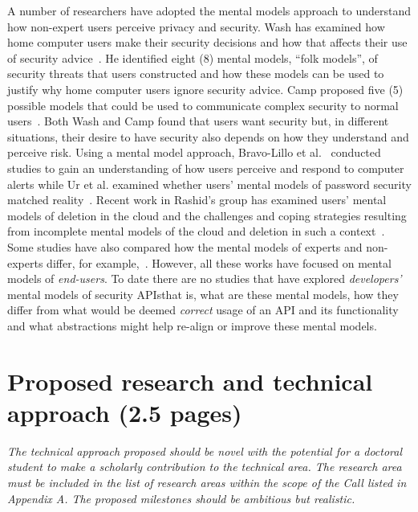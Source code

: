 \documentclass[10pt]{article}
\begin{document}
A number of researchers have adopted the mental models approach to understand how non-expert users perceive privacy and security. Wash has examined how home computer users make their security decisions and how that affects their use of security advice~\cite{wash2010folk}. He identified eight (8) mental models, ``folk models'', of security threats that users constructed and how these models can be used to justify why home computer users ignore security advice. Camp proposed five (5) possible models that could be used to communicate complex security to normal users~\cite{camp2009mental}. Both Wash and Camp found that users want security but, in different situations, their desire to have security also depends on how they understand and perceive risk. Using a mental model approach, Bravo-Lillo et al.~\cite{bravo2011bridging} conducted studies to gain an understanding of how users perceive and respond to computer alerts while Ur et al. examined whether users' mental models of password security matched reality~\cite{ur2016users}. Recent work in Rashid's group has examined users' mental models of deletion in the cloud and the challenges and coping strategies resulting from incomplete mental models of the cloud and deletion in such a context~\cite{ramokapane2017}. Some studies have also compared how the mental models of experts and non-experts differ, for example,~\cite{ion2015no}. However, all these works have focused on mental models of \emph{end-users}. To date there are no studies that have explored \emph{developers'} mental models of security APIs\textemdash that is, what are these mental models, how they differ from what would be deemed \emph{correct} usage of an API and its functionality and what abstractions might help re-align or improve these mental models.  



\section{Proposed research and technical approach (2.5 pages)}

\emph{The technical approach proposed should be novel with the potential for a doctoral student to make a scholarly contribution to the technical area. The research area must be included in the list of research areas within the scope of the Call listed in Appendix A. The proposed milestones should be ambitious but realistic.}




%
\end{document}
